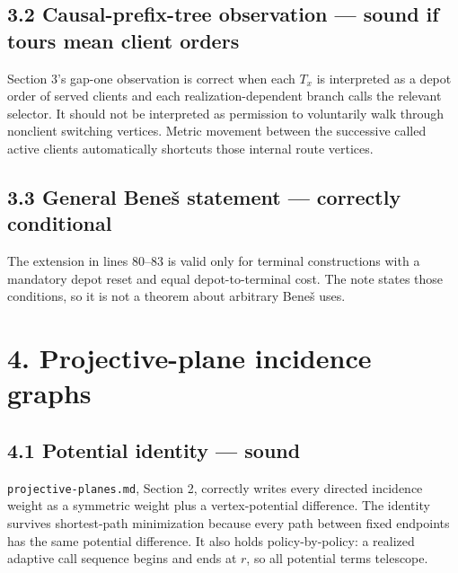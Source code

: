 \documentclass[11pt,a4paper]{article}
\begin{document}
\subsection*{3.2 Causal-prefix-tree observation — sound if tours mean client orders}

Section 3's gap-one observation is correct when each \(T_x\) is interpreted as a depot order of served clients and each realization-dependent branch calls the relevant selector.  It should not be interpreted as permission to voluntarily walk through nonclient switching vertices.  Metric movement between the successive called active clients automatically shortcuts those internal route vertices.


\subsection*{3.3 General Beneš statement — correctly conditional}

The extension in lines 80–83 is valid only for terminal constructions with a mandatory depot reset and equal depot-to-terminal cost.  The note states those conditions, so it is not a theorem about arbitrary Beneš uses.


\section*{4. Projective-plane incidence graphs}

\subsection*{4.1 Potential identity — sound}

\nolinkurl{projective-planes.md}, Section 2, correctly writes every directed incidence weight as a symmetric weight plus a vertex-potential difference.  The identity survives shortest-path minimization because every path between fixed endpoints has the same potential difference.  It also holds policy-by-policy: a realized adaptive call sequence begins and ends at \(r\), so all potential terms telescope.


\end{document}
